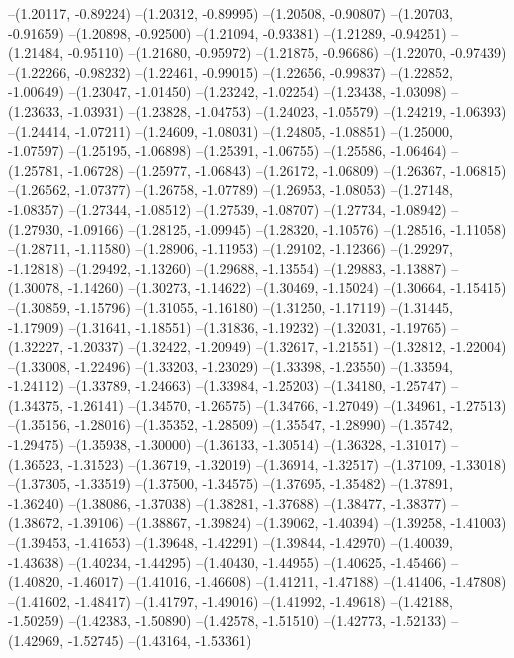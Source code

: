 --(1.20117, -0.89224)
--(1.20312, -0.89995)
--(1.20508, -0.90807)
--(1.20703, -0.91659)
--(1.20898, -0.92500)
--(1.21094, -0.93381)
--(1.21289, -0.94251)
--(1.21484, -0.95110)
--(1.21680, -0.95972)
--(1.21875, -0.96686)
--(1.22070, -0.97439)
--(1.22266, -0.98232)
--(1.22461, -0.99015)
--(1.22656, -0.99837)
--(1.22852, -1.00649)
--(1.23047, -1.01450)
--(1.23242, -1.02254)
--(1.23438, -1.03098)
--(1.23633, -1.03931)
--(1.23828, -1.04753)
--(1.24023, -1.05579)
--(1.24219, -1.06393)
--(1.24414, -1.07211)
--(1.24609, -1.08031)
--(1.24805, -1.08851)
--(1.25000, -1.07597)
--(1.25195, -1.06898)
--(1.25391, -1.06755)
--(1.25586, -1.06464)
--(1.25781, -1.06728)
--(1.25977, -1.06843)
--(1.26172, -1.06809)
--(1.26367, -1.06815)
--(1.26562, -1.07377)
--(1.26758, -1.07789)
--(1.26953, -1.08053)
--(1.27148, -1.08357)
--(1.27344, -1.08512)
--(1.27539, -1.08707)
--(1.27734, -1.08942)
--(1.27930, -1.09166)
--(1.28125, -1.09945)
--(1.28320, -1.10576)
--(1.28516, -1.11058)
--(1.28711, -1.11580)
--(1.28906, -1.11953)
--(1.29102, -1.12366)
--(1.29297, -1.12818)
--(1.29492, -1.13260)
--(1.29688, -1.13554)
--(1.29883, -1.13887)
--(1.30078, -1.14260)
--(1.30273, -1.14622)
--(1.30469, -1.15024)
--(1.30664, -1.15415)
--(1.30859, -1.15796)
--(1.31055, -1.16180)
--(1.31250, -1.17119)
--(1.31445, -1.17909)
--(1.31641, -1.18551)
--(1.31836, -1.19232)
--(1.32031, -1.19765)
--(1.32227, -1.20337)
--(1.32422, -1.20949)
--(1.32617, -1.21551)
--(1.32812, -1.22004)
--(1.33008, -1.22496)
--(1.33203, -1.23029)
--(1.33398, -1.23550)
--(1.33594, -1.24112)
--(1.33789, -1.24663)
--(1.33984, -1.25203)
--(1.34180, -1.25747)
--(1.34375, -1.26141)
--(1.34570, -1.26575)
--(1.34766, -1.27049)
--(1.34961, -1.27513)
--(1.35156, -1.28016)
--(1.35352, -1.28509)
--(1.35547, -1.28990)
--(1.35742, -1.29475)
--(1.35938, -1.30000)
--(1.36133, -1.30514)
--(1.36328, -1.31017)
--(1.36523, -1.31523)
--(1.36719, -1.32019)
--(1.36914, -1.32517)
--(1.37109, -1.33018)
--(1.37305, -1.33519)
--(1.37500, -1.34575)
--(1.37695, -1.35482)
--(1.37891, -1.36240)
--(1.38086, -1.37038)
--(1.38281, -1.37688)
--(1.38477, -1.38377)
--(1.38672, -1.39106)
--(1.38867, -1.39824)
--(1.39062, -1.40394)
--(1.39258, -1.41003)
--(1.39453, -1.41653)
--(1.39648, -1.42291)
--(1.39844, -1.42970)
--(1.40039, -1.43638)
--(1.40234, -1.44295)
--(1.40430, -1.44955)
--(1.40625, -1.45466)
--(1.40820, -1.46017)
--(1.41016, -1.46608)
--(1.41211, -1.47188)
--(1.41406, -1.47808)
--(1.41602, -1.48417)
--(1.41797, -1.49016)
--(1.41992, -1.49618)
--(1.42188, -1.50259)
--(1.42383, -1.50890)
--(1.42578, -1.51510)
--(1.42773, -1.52133)
--(1.42969, -1.52745)
--(1.43164, -1.53361)
